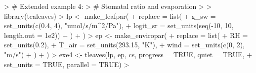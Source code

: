 \documentclass[11pt, oneside]{article}
\begin{document}
\clearpage

\begin{Schunk}
\begin{Sinput}
> # Extended example 4: 
> # Stomatal ratio and evaporation
> 
> library(tealeaves)
> lp  <- make_leafpar(
+   replace = list(
+     g_sw = set_units(c(0.4, 4), "umol/s/m^2/Pa"),
+     logit_sr = set_units(seq(-10, 10, length.out = 1e2))
+   )
+ )
> ep <- make_enviropar(
+   replace = list(
+     RH = set_units(0.2),
+     T_air = set_units(293.15, "K"),
+     wind = set_units(c(0, 2), "m/s")
+   )
+ )
> exe4 <- tleaves(lp, ep, cs, progress = TRUE, quiet = TRUE, 
+                 set_units = TRUE, parallel = TRUE)
> 
\end{Sinput}
\end{Schunk}
\end{document}
